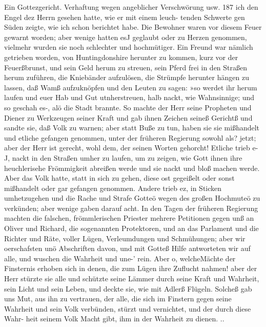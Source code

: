 Ein Gottezgericht. Verhaftung wegen angeblicher Verschwörung usw. 187
ich den Engel dez Herrn gesehen hatte, wie er mit einem leuch-
tenden Schwerte gen Süden zeigte, wie ich schon berichtet habe.
Die Bewohner waren vor diesem Feuer gewarnt worden; aber
wenige hatten esJ geglaubt oder zu Herzen genommen, vielmehr
wurden sie noch schlechter und hochmütiger. Ein Freund war nämlich
getrieben worden, von Huntingdonshire herunter zu kommen, kurz
vor der Feuerßbrunst, und sein Geld herum zu streuen, sein Pferd
frei in den Straßen herum zuführen, die Kniebänder aufzulösen,
die Strümpfe herunter hängen zu lassen, daß Wamß aufzuknöpfen
und den Leuten zu sagen: »so werdet ihr herum laufen und euer
Hab und Gut utnherstreuen, halb nackt, wie Wahnsinnige; und so
geschah es-, alö die Stadt brannte. So machte der Herr seine
Propheten und Diener zu Werkzeugen seiner Kraft und gab
ihnen Zeichen seineß Gerichtß und sandte sie, daß Volk zu warnen;
aber statt Buße zu tun, haben sie sie mißhandelt und etliche
gefangen genommen, unter der früheren Regierung sowohl als?
jetzt; aber der Herr ist gerecht, wohl dem, der seinen Worten
gehorcht! Etliche trieb e-J, nackt in den Straßen umher zu laufen,
um zu zeigen, wie Gott ihnen ihre heuchlerisehe Frömmigkeit
abreißen werde und sie nackt und bloß machen werde. Aber
das Volk hatte, statt in sich zu gehen, diese ost gegeißelt oder
sonst mißhandelt oder gar gefangen genommen. Andere trieb ez,
in Sticken umhetzugehen und die Rache und Strafe Gotteö wegen
des großen Hochmuteö zu verkünden; aber wenige gaben darauf
acht. In den Tagen der früheren Regierung machten die falschen,
frömmlerischen Priester mehrere Petitionen gegen unß an Oliver
und Richard, die sogenannten Protektoren, und an das Parlament
und die Richter und Räte, voller Lügen, Verleumdungen und
Schmühungen; aber wir oerschafsten unö Abschriften davon, und
mit Gotteß Hilfe antworteten wir auf alle, und wuschen die
Wahrheit und une-’ rein. Aber o, welcheMächte der Finsternis erhoben
sich in denen, die zum Lügen ihre Zuflucht nahmen! aber der
Herr stürzte sie alle und schützte seine Lämmer durch seine Kraft
und Wahrheit, sein Licht und sein Leben, und deckte sie, wie mit
Adlerß Flügeln. Solcheß gab uns Mut, aus ihn zu vertrauen,
der alle, die sich im Finstern gegen seine Wahrheit und sein Volk
verbünden, stürzt und vernichtet, und der durch diese Wahr-
heit seinem Volk Macht gibt, ihm in der Wahrheit zu dienen. ..


